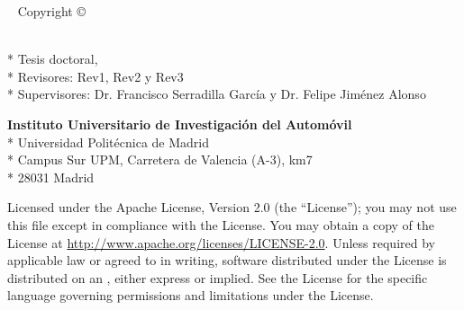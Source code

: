 \cleardoublepage
\begin{fullwidth}
~\vfill
\thispagestyle{empty}
\setlength{\parindent}{0pt}
\setlength{\parskip}{\baselineskip}
Copyright \copyright\ \the\year\ \theauthor

\par{
	\textit{\thetitle}\\*
	Tesis doctoral, \thedate\\*
	Revisores: Rev1, Rev2 y Rev3\\*
	Supervisores: Dr. Francisco Serradilla García y Dr. Felipe Jiménez Alonso
	}

\par{
	\textbf{Instituto Universitario de Investigación del Automóvil}\\*
	Universidad Politécnica de Madrid\\*
	Campus Sur UPM, Carretera de Valencia (A-3), km7\\*
	28031 Madrid
}

\par Licensed under the Apache License, Version 2.0 (the ``License''); you may not use this file except in compliance with the License. You may obtain a copy of the License at \url{http://www.apache.org/licenses/LICENSE-2.0}. Unless required by applicable law or agreed to in writing, software distributed under the License is distributed on an , either express or implied. See the License for the specific language governing permissions and limitations under the License.


\end{fullwidth}